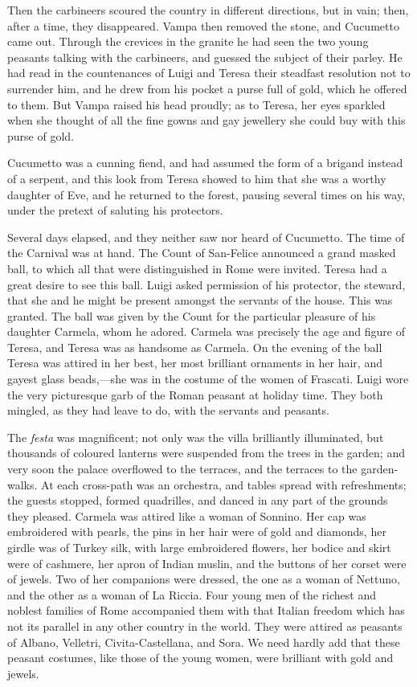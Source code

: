 {Then the carbineers scoured the country in different directions, but in vain; then, after a time, they disappeared. Vampa then removed the stone, and Cucumetto came out. Through the crevices in the granite he had seen the two young peasants talking with the carbineers, and guessed the subject of their parley. He had read in the countenances of Luigi and Teresa their steadfast resolution not to surrender him, and he drew from his pocket a purse full of gold, which he offered to them. But Vampa raised his head proudly; as to Teresa, her eyes sparkled when she thought of all the fine gowns and gay jewellery she could buy with this purse of gold. 

Cucumetto was a cunning fiend, and had assumed the form of a brigand instead of a serpent, and this look from Teresa showed to him that she was a worthy daughter of Eve, and he returned to the forest, pausing several times on his way, under the pretext of saluting his protectors. 

Several days elapsed, and they neither saw nor heard of Cucumetto. The time of the Carnival was at hand. The Count of San-Felice announced a grand masked ball, to which all that were distinguished in Rome were invited. Teresa had a great desire to see this ball. Luigi asked permission of his protector, the steward, that she and he might be present amongst the servants of the house. This was granted. The ball was given by the Count for the particular pleasure of his daughter Carmela, whom he adored. Carmela was precisely the age and figure of Teresa, and Teresa was as handsome as Carmela. On the evening of the ball Teresa was attired in her best, her most brilliant ornaments in her hair, and gayest glass beads,—she was in the costume of the women of Frascati. Luigi wore the very picturesque garb of the Roman peasant at holiday time. They both mingled, as they had leave to do, with the servants and peasants. 

The \textit{festa} was magnificent; not only was the villa brilliantly illuminated, but thousands of coloured lanterns were suspended from the trees in the garden; and very soon the palace overflowed to the terraces, and the terraces to the garden-walks. At each cross-path was an orchestra, and tables spread with refreshments; the guests stopped, formed quadrilles, and danced in any part of the grounds they pleased. Carmela was attired like a woman of Sonnino. Her cap was embroidered with pearls, the pins in her hair were of gold and diamonds, her girdle was of Turkey silk, with large embroidered flowers, her bodice and skirt were of cashmere, her apron of Indian muslin, and the buttons of her corset were of jewels. Two of her companions were dressed, the one as a woman of Nettuno, and the other as a woman of La Riccia. Four young men of the richest and noblest families of Rome accompanied them with that Italian freedom which has not its parallel in any other country in the world. They were attired as peasants of Albano, Velletri, Civita-Castellana, and Sora. We need hardly add that these peasant costumes, like those of the young women, were brilliant with gold and jewels. 

}
